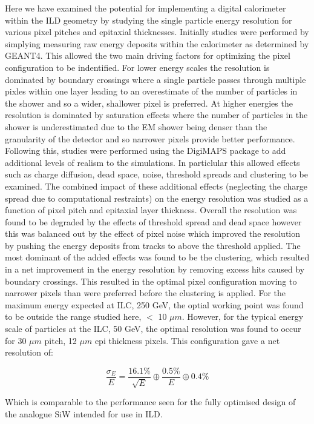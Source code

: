 Here we have examined the potential for implementing a digital calorimeter within the \ac{ILD} geometry by studying the single particle energy resolution for various pixel pitches and epitaxial thicknesses. Initially studies were performed by simplying measuring raw energy deposits within the calorimeter as determined by GEANT4. This allowed the two main driving factors for optimizing the pixel configuration to be indentified. For lower energy scales the resolution is dominated by boundary crossings where a single particle passes through multiple pixles within one layer leading to an overestimate of the number of particles in the shower and so a wider, shallower pixel is preferred. At higher energies the resolution is dominated by saturation effects where the number of particles in the shower is underestimated due to the EM shower being denser than the granularity of the detector and so narrower pixels provide better performance. Following this, studies were performed using the DigiMAPS package to add additional levels of realism to the simulations. In particlular this allowed effects such as charge diffusion, dead space, noise, threshold spreads and clustering to be examined. The combined impact of these additional effects (neglecting the charge spread due to computational restraints) on the energy resolution was studied as a function of pixel pitch and epitaxial layer thickness. Overall the resolution was found to be degraded by the effects of threshold spread and dead space however this was balanced out by the effect of pixel noise which improved the resolution by pushing the energy deposits from tracks to above the threshold applied. The most dominant of the added effects was found to be the clustering, which resulted in a net improvement in the energy resolution by removing excess hits caused by boundary crossings. This resulted in the optimal pixel configuration moving to narrower pixels than were preferred before the clustering is applied. For the maximum energy expected at \ac{ILC}, 250 GeV, the optial working point was found to be outside the range studied here, $<$ 10 $\mu m$. However, for the typical energy scale of particles at the \ac{ILC}, 50 GeV, the optimal resolution was found to occur for 30 $\mu m$ pitch, 12 $\mu m$ epi thickness pixels. This configuration gave a net resolution of:

\begin{equation}
  \frac{\sigma_E}{E}=\frac{16.1\%}{\sqrt{E}} \oplus \frac{0.5\%}{E} \oplus 0.4\%
\end{equation}

Which is comparable to the performance seen for the fully optimised design of the analogue SiW intended for use in \ac{ILD}. 
